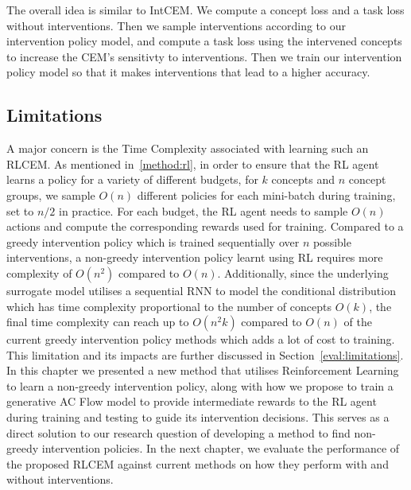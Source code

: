 The overall idea is similar to IntCEM. We compute a concept loss
and a task loss without interventions.
Then we sample interventions according to our intervention policy model,
and compute a task loss using the intervened concepts to increase 
the CEM's sensitivty to interventions. Then we train our intervention policy
model so that it makes interventions that lead to a higher accuracy.

\subsection{Limitations}

A major concern is the Time Complexity associated with learning
such an RLCEM. As mentioned in~\ref{method:rl}, in order to ensure
that the RL agent learns a policy for a variety of different budgets,
for $k$ concepts and $n$ concept groups,
 we sample $O(n)$ different policies for each mini-batch during training, set 
to $n/2$ in practice. For each budget, the RL agent needs to sample
$O(n)$ actions and compute the corresponding rewards used for training. 
Compared to
a greedy intervention policy which is trained sequentially over
$n$ possible interventions, 
a non-greedy intervention policy learnt using
RL requires more complexity of $O(n^2)$ compared to $O(n)$.
Additionally, since the underlying surrogate model utilises a sequential
RNN to model the conditional distribution which has time complexity
proportional to the number of concepts $O(k)$, the final 
time complexity can reach up to $O(n^2k)$ compared to $O(n)$ of the current
greedy intervention policy methods which adds a lot of cost to training.
This limitation
and its impacts
are further discussed in Section~\ref{eval:limitations}.\\

In this chapter we presented a new method 
that utilises Reinforcement Learning
to learn a non-greedy intervention policy,
along with how we propose 
to train a generative AC Flow model to
provide intermediate rewards to the RL agent during
training and testing to guide its intervention decisions.
This serves as a direct solution to our research question of 
developing a method to find non-greedy intervention policies.
In the next chapter, we evaluate the performance of the proposed
RLCEM against current methods on how
they perform with and without interventions.


